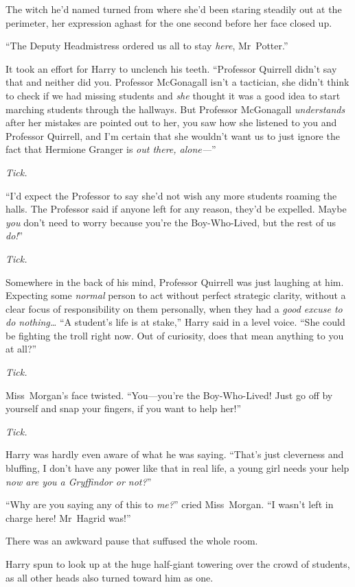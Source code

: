 The witch he’d named turned from where she’d been staring steadily out at the perimeter, her expression aghast for the one second before her face closed up.

“The Deputy Headmistress ordered us all to stay \emph{here}, Mr~Potter.”

It took an effort for Harry to unclench his teeth. “Professor Quirrell didn’t say that and neither did you. Professor McGonagall isn’t a tactician, she didn’t think to check if we had missing students and \emph{she} thought it was a good idea to start marching students through the hallways. But Professor McGonagall \emph{understands} after her mistakes are pointed out to her, you saw how she listened to you and Professor Quirrell, and I’m certain that she wouldn’t want us to just ignore the fact that Hermione Granger is \emph{out there, alone—}”

\emph{Tick.}

“I’d expect the Professor to say she’d not wish any more students roaming the halls. The Professor said if anyone left for any reason, they’d be expelled. Maybe \emph{you} don’t need to worry because you’re the Boy-Who-Lived, but the rest of us \emph{do!}”

\emph{Tick.}

Somewhere in the back of his mind, Professor Quirrell was just laughing at him. Expecting some \emph{normal} person to act without perfect strategic clarity, without a clear focus of responsibility on them personally, when they had a \emph{good excuse to do nothing…} “A student’s life is at stake,” Harry said in a level voice. “She could be fighting the troll right now. Out of curiosity, does that mean anything to you at all?”

\emph{Tick.}

Miss~Morgan’s face twisted. “You—you’re the Boy-Who-Lived! Just go off by yourself and snap your fingers, if you want to help her!”

\emph{Tick.}

Harry was hardly even aware of what he was saying. “That’s just cleverness and bluffing, I don’t have any power like that in real life, a young girl needs your help \emph{now are you a Gryffindor or not?}”

“Why are you saying any of this to \emph{me?}” cried Miss~Morgan. “I wasn’t left in charge here! Mr~Hagrid was!”

There was an awkward pause that suffused the whole room.

Harry spun to look up at the huge half-giant towering over the crowd of students, as all other heads also turned toward him as one.

